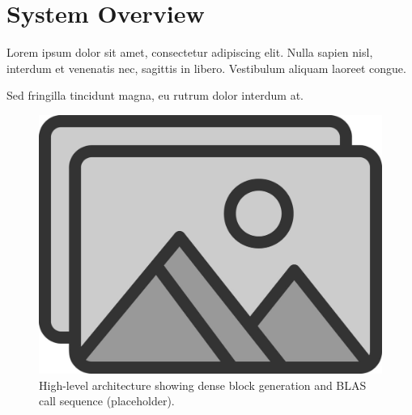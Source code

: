 \section{System Overview}
Lorem ipsum dolor sit amet, consectetur adipiscing elit. Nulla sapien nisl,
interdum et venenatis nec, sagittis in libero. Vestibulum aliquam laoreet
congue.

Sed fringilla tincidunt magna, eu rutrum dolor interdum at. 

\begin{figure}[t]
  \centering
  \includegraphics[width=\linewidth]{figs/placeholder}
  \caption{High-level architecture showing dense block generation and BLAS call
           sequence (placeholder).}
  \label{fig:overview_arch}
\end{figure}

